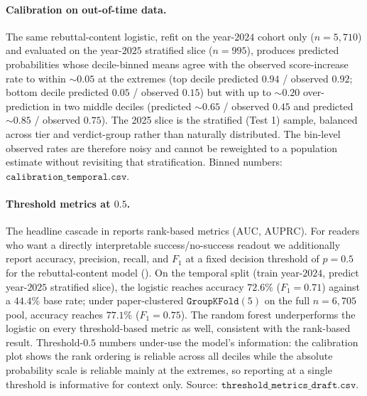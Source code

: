 \documentclass{article}
\newcommand{\code}[1]{\texttt{#1}}
\newcommand{\auc}{\text{AUC}}
\newcommand{\auprc}{\text{AUPRC}}
\begin{document}
\paragraph{Calibration on out-of-time data.} The same rebuttal-content logistic, refit on the year-$2024$ cohort only ($n = 5{,}710$) and evaluated on the year-$2025$ stratified slice ($n = 995$), produces predicted probabilities whose decile-binned means agree with the observed score-increase rate to within $\sim 0.05$ at the extremes (top decile predicted $0.94$ / observed $0.92$; bottom decile predicted $0.05$ / observed $0.15$) but with up to $\sim 0.20$ over-prediction in two middle deciles (predicted $\sim 0.65$ / observed $0.45$ and predicted $\sim 0.85$ / observed $0.75$). The 2025 slice is the stratified  (Test 1) sample, balanced across tier and verdict-group rather than naturally distributed. The bin-level observed rates are therefore noisy and cannot be reweighted to a population estimate without revisiting that stratification. Binned numbers: $\code{calibration\_temporal.csv}$.

\paragraph{Threshold metrics at $0.5$.} The headline cascade in  reports rank-based metrics ($\auc$, $\auprc$). For readers who want a directly interpretable success/no-success readout we additionally report accuracy, precision, recall, and $F_1$ at a fixed decision threshold of $p = 0.5$ for the rebuttal-content model (). On the temporal split (train year-$2024$, predict year-$2025$ stratified slice), the logistic reaches accuracy $72.6\%$ ($F_1 = 0.71$) against a $44.4\%$ base rate; under paper-clustered $\texttt{GroupKFold}(5)$ on the full $n = 6{,}705$ pool, accuracy reaches $77.1\%$ ($F_1 = 0.75$). The random forest underperforms the logistic on every threshold-based metric as well, consistent with the rank-based result. Threshold-$0.5$ numbers under-use the model's information: the calibration plot shows the rank ordering is reliable across all deciles while the absolute probability scale is reliable mainly at the extremes, so reporting at a single threshold is informative for context only. Source: $\code{threshold\_metrics\_draft.csv}$.
\end{document}
